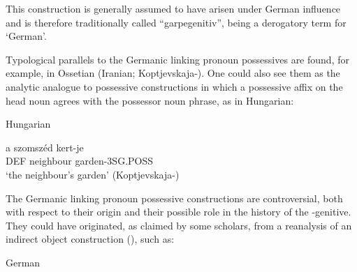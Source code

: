 This construction is generally assumed to have arisen under German influence and is therefore traditionally called “garpegenitiv”,  being a derogatory term for ‘German’.


Typological parallels to the Germanic linking pronoun possessives are found, for example, in Ossetian (Iranian; Koptjevskaja-\citet[669]{Tamm2003}). One could also see them as the analytic analogue to possessive constructions in which a possessive affix on the head noun agrees with the possessor noun phrase, as in Hungarian:


\item 

Hungarian



 \ea\label{}
\gll a  szomszéd  kert-je\\


DEF  neighbour  garden-3SG.POSS\\

\glt ‘the neighbour’s garden’ (Koptjevskaja-\citet[648]{Tamm2003}) 

\z

The Germanic linking pronoun possessive constructions are controversial, both with respect to their origin and their possible role in the history of the -genitive. They could have originated, as claimed by some scholars, from a reanalysis of an indirect object construction (\citet[638]{Behaghel1923}), such as:


\item 

German

